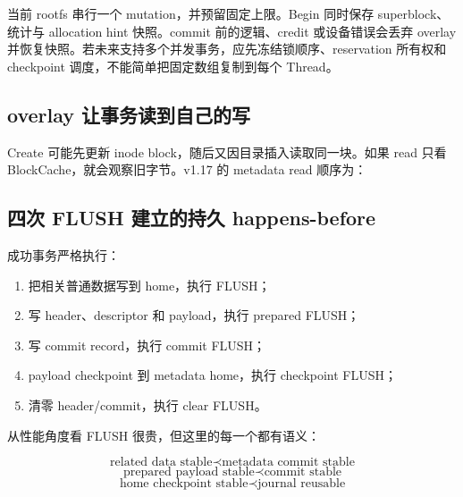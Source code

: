 当前 rootfs 串行一个 mutation，并预留固定上限。Begin 同时保存 superblock、
统计与 allocation hint 快照。commit 前的逻辑、credit 或设备错误会丢弃
overlay 并恢复快照。若未来支持多个并发事务，应先冻结锁顺序、reservation
所有权和 checkpoint 调度，不能简单把固定数组复制到每个 Thread。

\subsection{overlay 让事务读到自己的写}

Create 可能先更新 inode block，随后又因目录插入读取同一块。如果 read 只看
BlockCache，就会观察旧字节。v1.17 的 metadata read 顺序为：

\begin{center}
\end{center}

\subsection{四次 FLUSH 建立的持久 happens-before}

成功事务严格执行：

\begin{enumerate}
  \item 把相关普通数据写到 home，执行 FLUSH；
  \item 写 header、descriptor 和 payload，执行 prepared FLUSH；
  \item 写 commit record，执行 commit FLUSH；
  \item payload checkpoint 到 metadata home，执行 checkpoint FLUSH；
  \item 清零 header/commit，执行 clear FLUSH。
\end{enumerate}

从性能角度看 FLUSH 很贵，但这里的每一个都有语义：

\[
\text{related data stable}
\prec
\text{metadata commit stable}
\]
\[
\text{prepared payload stable}
\prec
\text{commit stable}
\]
\[
\text{home checkpoint stable}
\prec
\text{journal reusable}
\]

